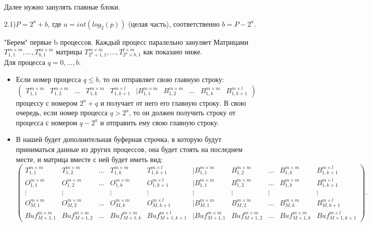 \documentclass[a4paper,12pt]{article}
\begin{document}
Далее нужно занулять главные блоки.

2.1)$P = 2^{a} + b$, где $a = int(log_{2}(p))$ (целая часть), соответственно $b = P-2^a$.

"Берем" первые b процессов. Каждый процесс паралельно зануляет Матрицами $T_{1,1}^{m \times m}, \dots, T_{b,1}^{m \times m}$ матрицы $T_{2^{a} +1,1}^{m \times m}, \dots , T_{2^{a} +b,1}^{l \times m}$ как показано ниже.\\ 
Для процесса $q = 0, \dots , b$: 
\begin{itemize}
  \item Если номер процесса $q \leq b$, то он отправляет свою главную строку:
  \[
  \begin{pmatrix}
  T_{1,1}^{m \times m} & T_{1,2}^{m \times m} & \dots & T_{1,k}^{m \times m} & T_{1,k+1}^{m \times l} & | B_{1,1}^{m \times m} & B_{1,2}^{m \times m} & \dots & B_{1,k}^{m\times m} & B_{1,k+1}^{m \times l}
  \end{pmatrix}
  \]
  процессу с номером $2^{a} + q$ и получает от него его главную строку. В свою очередь, если номер процесса $q > 2^{a}$, то он должен получить строку от процесса с номером $q - 2^{a}$ и отправить ему свою главную строку.
  
  \item В нашей будет дополнительная буферная строчка, в которую будут приниматься данные из других процессов, она будет стоять на последнем месте, и матрица вместе с ней будет иметь вид:
  \[
  \begin{pmatrix}
  T_{1,1}^{m \times m} & T_{1,2}^{m \times m} & \dots & T_{1,k}^{m \times m} & T_{1,k+1}^{m \times l} & | B_{1,1}^{m \times m} & B_{1,2}^{m \times m} & \dots & B_{1,k}^{m\times m} & B_{1,k+1}^{m \times l} \\
  O_{1,1}^{m \times m} & O_{1,2}^{m \times m} & \dots & O_{1,k}^{m \times m} & O_{1,k+1}^{m \times l} & | B_{1,1}^{m \times m} & B_{1,2}^{m \times m} & \dots & B_{1,k}^{m\times m} & B_{1,k+1}^{m \times l} \\
  \vdots & \vdots &  & \vdots & \vdots & \vdots & \vdots & \vdots &  & \vdots \\
  O_{M,1}^{m \times m} & O_{M,2}^{m \times m} & \dots & O_{M,k}^{m \times m} & O_{M,k+1}^{m \times l} & | B_{M,1}^{m \times m} & B_{M,2}^{m \times m} & \dots & B_{M,k}^{m\times m} & B_{M,k+1}^{m \times l} \\
  Buf_{M+1,1}^{m \times m} & Buf_{M+1,2}^{m \times m} & \dots & Buf_{M+1,k}^{m \times m} & Buf_{M+1,k+1}^{m \times l} & | Buf_{M+1,1}^{m \times m} & Buf_{M+1,2}^{m \times m} & \dots & Buf_{M+1,k}^{m\times m} & Buf_{M+1,k+1}^{m \times l}
  \end{pmatrix}.
  \]


\end{itemize}
\end{document}

